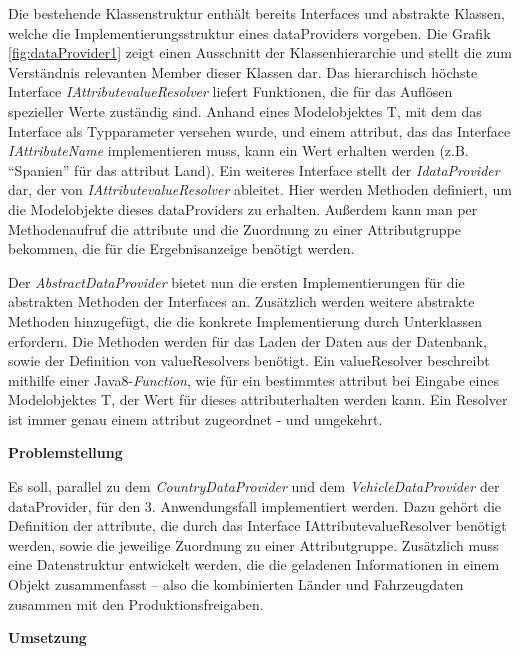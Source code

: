 Die bestehende Klassenstruktur enthält bereits Interfaces und abstrakte Klassen, welche die Implementierungsstruktur eines \gls{dataProvider}s vorgeben. Die Grafik \ref{fig:dataProvider1} zeigt einen Ausschnitt der Klassenhierarchie und stellt die zum Verständnis relevanten Member dieser Klassen dar. Das hierarchisch höchste Interface \textit{IAttribute\gls{valueResolver}} liefert Funktionen, die für das Auflösen spezieller Werte zuständig sind. Anhand eines Modelobjektes T, mit dem das Interface als Typparameter versehen wurde, und einem \gls{attribut}, das das Interface \textit{IAttributeName} implementieren muss, kann ein Wert erhalten werden (z.B. \enquote{Spanien} für das \gls{attribut} Land).
Ein weiteres Interface stellt der \textit{I\gls{dataProvider}} dar, der von \textit{IAttribute\gls{valueResolver}} ableitet. Hier werden Methoden definiert, um die Modelobjekte dieses \gls{dataProvider}s zu erhalten. Außerdem kann man per Methodenaufruf die \gls{attribut}e und die Zuordnung zu einer Attributgruppe bekommen, die für die Ergebnisanzeige benötigt werden.

Der \textit{AbstractDataProvider} bietet nun die ersten Implementierungen für die abstrakten Methoden der Interfaces an. Zusätzlich werden weitere abstrakte Methoden hinzugefügt, die die konkrete Implementierung durch Unterklassen erfordern. Die Methoden werden für das Laden der Daten aus der Datenbank, sowie der Definition von \gls{valueResolver}s  benötigt. Ein \gls{valueResolver} beschreibt mithilfe einer Java8-\textit{Function}, wie für ein bestimmtes \gls{attribut} bei Eingabe eines Modelobjektes T, der Wert für dieses \gls{attribut}erhalten werden kann. Ein Resolver ist immer genau einem \gls{attribut} zugeordnet - und umgekehrt.

\textbf{Problemstellung}

Es soll, parallel zu dem \textit{CountryDataProvider} und dem \textit{VehicleDataProvider} der \gls{dataProvider}, für den 3. Anwendungsfall implementiert werden. Dazu gehört die Definition der \gls{attribut}e, die durch das Interface IAttribute\gls{valueResolver} benötigt werden, sowie die jeweilige Zuordnung zu einer Attributgruppe. Zusätzlich muss eine Datenstruktur entwickelt werden, die die geladenen Informationen in einem Objekt zusammenfasst – also die kombinierten Länder und Fahrzeugdaten zusammen mit den Produktionsfreigaben.

\textbf{Umsetzung}

